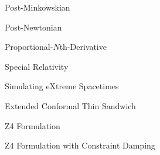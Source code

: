 \documentclass[11pt]{caltech_thesis}
\begin{document}
\begin{description}[labelwidth=1.6cm, leftmargin=2.1cm, style=sameline,
                    font=\normalfont\bfseries, itemsep=2pt]
  \item[PM]     Post-Minkowskian
  \item[PN]     Post-Newtonian
  \item[PND]    Proportional-$N$th-Derivative
  \item[SR]     Special Relativity
  \item[SXS]    Simulating eXtreme Spacetimes
  \item[XCTS]   Extended Conformal Thin Sandwich
  \item[Z4]     Z4 Formulation
  \item[Z4c]    Z4 Formulation with Constraint Damping
\end{description}

\mainmatter










\end{document}
